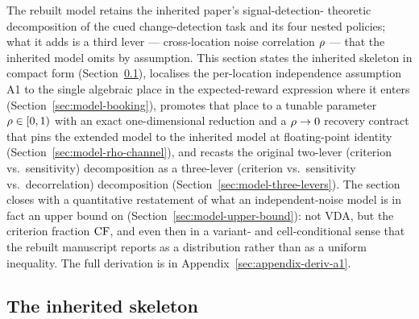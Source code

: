 The rebuilt model retains the inherited paper's signal-detection-
theoretic decomposition of the cued change-detection task and its
four nested policies; what it adds is a third lever — cross-location
noise correlation $\rho$ — that the inherited model omits by
assumption. This section states the inherited skeleton in compact
form (Section~\ref{sec:model-inherited}), localises the per-location
independence assumption A1 to the single algebraic place in the
expected-reward expression where it enters
(Section~\ref{sec:model-booking}), promotes that place to a tunable
parameter $\rho \in [0, 1)$ with an exact one-dimensional reduction
and a $\rho \to 0$ recovery contract that pins the extended model
to the inherited model at floating-point identity
(Section~\ref{sec:model-rho-channel}), and recasts the original
two-lever (criterion vs.\ sensitivity) decomposition as a three-lever
(criterion vs.\ sensitivity vs.\ decorrelation) decomposition
(Section~\ref{sec:model-three-levers}). The
section closes with a quantitative restatement of what an
independent-noise model is in fact an upper bound on
(Section~\ref{sec:model-upper-bound}): not VDA, but the criterion
fraction $\mathrm{CF}$, and even then in a variant- and cell-conditional
sense that the rebuilt manuscript reports as a distribution rather
than as a uniform inequality. The full derivation is in
Appendix~\ref{sec:appendix-deriv-a1}.

\subsection{The inherited skeleton}
\label{sec:model-inherited}

